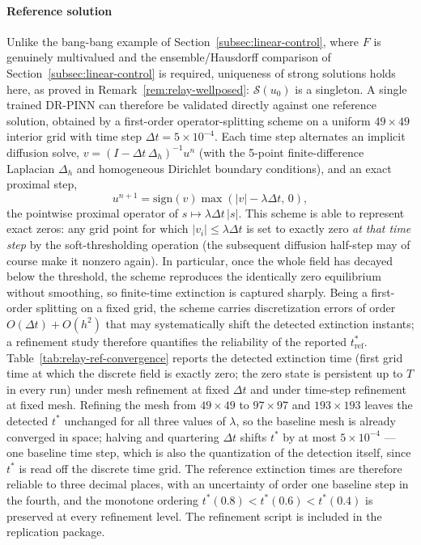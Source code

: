 \documentclass[11pt]{elsarticle}
\theoremstyle{definition}
\theoremstyle{remark}
\numberwithin{equation}{section}
\begin{document}
\paragraph{Reference solution}
Unlike the bang-bang example of Section~\ref{subsec:linear-control}, where
$F$ is genuinely multivalued and the ensemble/Hausdorff comparison of
Section~\ref{subsec:linear-control} is required, uniqueness of strong
solutions holds here, as proved in Remark~\ref{rem:relay-wellposed}:
$\mathcal{S}(u_0)$ is a singleton. A single trained
DR-PINN can therefore be validated directly against one reference solution,
obtained by a first-order operator-splitting scheme on a uniform
$49\times49$ interior grid with time step $\Delta t=5\times10^{-4}$.
Each time step alternates an implicit diffusion solve,
$v=(I-\Delta t\,\Delta_h)^{-1}u^n$ (with the 5-point finite-difference
Laplacian $\Delta_h$ and homogeneous Dirichlet boundary conditions), and an
exact proximal step,
\[
u^{n+1}=\mathrm{sign}(v)\max(|v|-\lambda\Delta t,\,0),
\]
the pointwise proximal operator of $s\mapsto\lambda\Delta t\,|s|$.
This scheme is able to represent exact zeros: any grid point for which
$|v_i|\le\lambda\Delta t$ is set to exactly zero \emph{at that time
step} by the soft-thresholding operation (the subsequent diffusion
half-step may of course make it nonzero again). In particular, once the
whole field has decayed below the threshold, the scheme reproduces the
identically zero equilibrium without smoothing, so finite-time extinction
is captured sharply. Being a first-order splitting on a fixed grid, the
scheme carries discretization errors of order $O(\Delta t)+O(h^2)$ that
may systematically shift the detected extinction instants; a refinement
study therefore quantifies the reliability of the reported
$t^*_{\mathrm{ref}}$. Table~\ref{tab:relay-ref-convergence} reports the
detected extinction time (first grid time at which the discrete field is
exactly zero; the zero state is persistent up to $T$ in every run) under
mesh refinement at fixed $\Delta t$ and under time-step refinement at
fixed mesh. Refining the mesh from $49\times49$ to $97\times97$ and
$193\times193$ leaves the detected $t^*$ unchanged for all three values
of $\lambda$, so the baseline mesh is already converged in space; halving
and quartering $\Delta t$ shifts $t^*$ by at most $5\times10^{-4}$ ---
one baseline time step, which is also the quantization of the detection
itself, since $t^*$ is read off the discrete time grid. The reference
extinction times are therefore reliable to three decimal places, with an
uncertainty of order one baseline step in the fourth, and the monotone
ordering $t^*(0.8)<t^*(0.6)<t^*(0.4)$ is preserved at every refinement
level. The refinement script is included in the replication package.
\end{document}

